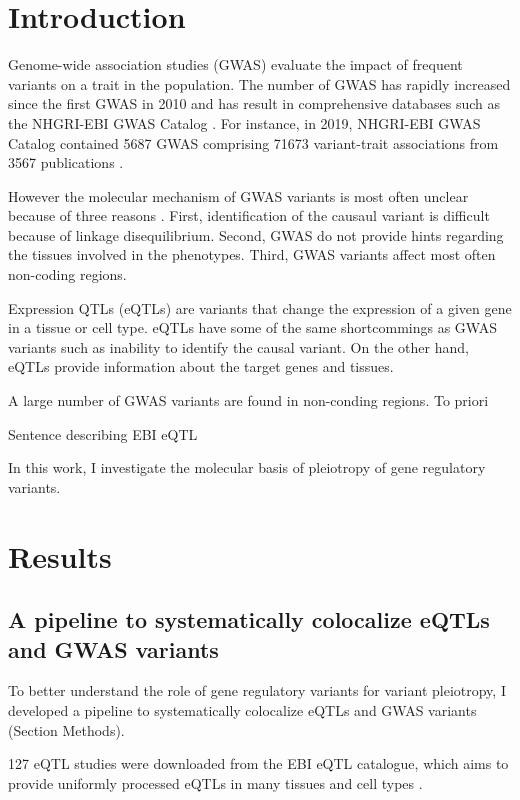 \section*{Introduction}\label{sec:introduction}

Genome-wide association studies (GWAS) evaluate the impact of frequent variants on a trait in the population.
%
The number of GWAS has rapidly increased since the first GWAS in 2010 and has result in comprehensive databases such as the NHGRI-EBI GWAS Catalog \citep{2018.Parkinson.Buniello}.
%
For instance, in 2019, NHGRI-EBI GWAS Catalog contained 5687 GWAS comprising 71673 variant-trait associations from 3567 publications \citep{2018.Parkinson.Buniello}.

However the molecular mechanism of GWAS variants is most often unclear because of three reasons \citep{2020.Trynka.CanoGamez}.
%
First, identification of the causaul variant is difficult because of linkage disequilibrium.
%
Second, GWAS do not provide hints regarding the tissues involved in the phenotypes.
%
Third, GWAS variants affect most often non-coding regions.

Expression QTLs (eQTLs) are variants that change the expression of a given gene in a tissue or cell type.
%
eQTLs have some of the same shortcommings as GWAS variants such as inability to identify the causal variant.
%
On the other hand, eQTLs provide information about the target genes and tissues.

A large number of GWAS variants are found in non-conding regions.
To priori

Sentence describing EBI eQTL

In this work, I investigate the molecular basis of pleiotropy of gene regulatory variants.

\section*{Results}\label{s:results}

\subsection*{A pipeline to systematically colocalize eQTLs and GWAS variants}

To better understand the role of gene regulatory variants for variant pleiotropy, I developed a pipeline to systematically colocalize eQTLs and GWAS variants (Section Methods).

127 eQTL studies were downloaded from the EBI eQTL catalogue, which aims to provide uniformly processed eQTLs in many tissues and cell types \citep{2021.Alasoo.Kerimov}.

